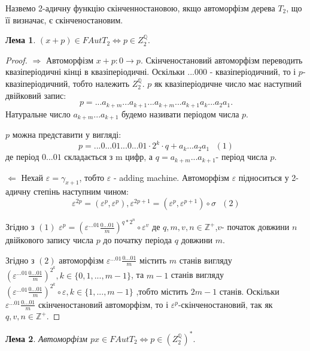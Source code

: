 \documentclass[a4paper,12pt]{article} \usepackage{a4wide}
\numberwithin{equation}{subsection}
\newtheorem{lemma}{Лема}[subsection]
\begin{document}
 Назвемо 2-адичну функцію скінченностановою, якщо автоморфізм дерева $T_2$, що її визначає, є скінченостановим.
  \begin{lemma} \label{ficen1} $(x+p)\in FAutT_2\Leftrightarrow p\in Z_2^{\mathbb{Q}}.$
\end{lemma}
\begin{proof}
$\Rightarrow$ Автоморфізм $x+p:0\rightarrow p$. Скінченостановий
автоморфізм переводить квазіперіодичні кінці в квазіперіодичні.
Оскільки $...000$ - квазіперіодичний, то і $p$- квазіперіодичний,
тобто належить $Z_2^{\mathbb{Q}}$. $p$ як квазіперіодичне число
має наступний двійковий запис:
$$p=...a_{k+m}...a_{k+1}...a_{k+m}...a_{k+1}a_k...a_2a_1.$$
Натуральне число $a_{k+m}...a_{k+1}$ будемо називати періодом
числа $p$.

$p$ можна представити у вигляді:$$p=...0...01...0...01\cdot
2^k\cdot q+a_k...a_2a_1 \ \ \ (1)$$ де період $0...01$ складається
з m цифр, а $q=a_{k+m}...a_{k+1}$- період числа  $p$.



 $\Leftarrow $
 Нехай $\varepsilon=\gamma_{x+1}$, тобто $\varepsilon$ - adding machine. Автоморфізм
  $\varepsilon$ підноситься у 2-адичну
 степінь наступним чином:
$$\varepsilon^{2p}=(\varepsilon^p,\varepsilon^p),\varepsilon^{2p+1}=(\varepsilon^p,\varepsilon^{p+1})\circ \sigma
  \ \ \ (2)$$


 Згідно з $(1)$ $\varepsilon^{p}=(\varepsilon^{...01} \frac{0...01}{m})^{q*
2^{n}}\circ  \varepsilon^v$ де $q,m,v,n\in \mathbb{Z^+}$,$v$-
початок довжини $n$ двійкового запису числа $p$ до початку періода
$q$ довжини $m$.

Згідно з $(2)$ автоморфізм $\varepsilon^{...01}\frac{0...01}{m}$
містить $m$ станів вигляду
$(\varepsilon^{...01}\frac{0...01}{m})^{2^k},k\in
\{0,1,...,m-1\}$, та $m-1$ станів вигляду
$(\varepsilon^{...01}\frac{0...01}{m})^{2^k}\circ \varepsilon,k\in
\{1,...,m-1\}$ ,тобто містить $2m-1$ станів. Оскільки
$\varepsilon^{...01}\frac{0...01}{m}$ скінченостановий
автоморфізм, то і $\varepsilon^p$-скінченостановий, так як
$q,v,n\in \mathbb{Z^+}$.
\end{proof}
    \begin{lemma} \label{ficen2} Автоморфізм $px\in FAutT_2\Leftrightarrow p\in (Z_2^{\mathbb{Q}})^*  .$
\end{lemma}
\end{document}
